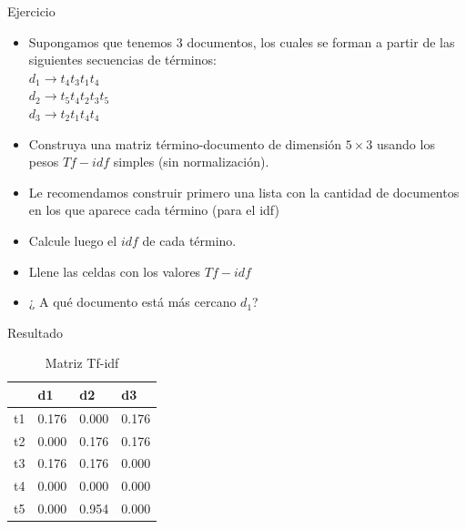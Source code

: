 \documentclass[mathserif]{beamer}
\begin{document}
\begin{frame}{Ejercicio}
\begin{itemize}
 \item Supongamos que tenemos $3$ documentos, los cuales se forman a partir de las siguientes secuencias de términos: \\
 $d_{1}\rightarrow t_{4}t_{3}t_{1}t_{4}$ \\
 $d_{2}\rightarrow t_{5}t_{4}t_{2}t_{3}t_{5}$ \\
 $d_{3}\rightarrow t_{2}t_{1}t_{4}t_{4}$ \\

\item Construya una matriz término-documento de dimensión $5 \times 3$ usando los pesos $Tf-idf$ simples (sin normalización).
\item Le recomendamos construir primero una lista con la cantidad de documentos en los que aparece cada término (para el idf) 
\item Calcule luego  el $idf$ de cada término.
\item Llene las celdas con los valores $Tf-idf$
\item ¿ A qué documento está más cercano $d_{1}$?
\end{itemize}


\end{frame}

\begin{frame}{Resultado}
 \begin{table}[htbp]
\caption{Matriz Tf-idf}
\begin{tabular}{|l|r|r|r|}
\hline
 & \multicolumn{1}{l|}{d1} & \multicolumn{1}{l|}{d2} & \multicolumn{1}{l|}{d3} \\ \hline
t1 & 0.176 & 0.000 & 0.176 \\ \hline
t2 & 0.000 & 0.176 & 0.176 \\ \hline
t3 & 0.176 & 0.176 & 0.000 \\ \hline
t4 & 0.000 & 0.000 & 0.000 \\ \hline
t5 & 0.000 & 0.954 & 0.000 \\ \hline
\end{tabular}
\end{table}

\end{frame}
\end{document}
